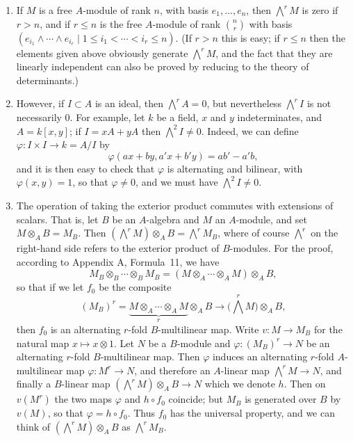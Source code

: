 \begin{enumerate}[(1)]
  \item If $M$ is a free $A$-module of rank $n$, with basis $e_1, \ldots, e_n$, then
        $\bigwedge^r M$ is zero if $r > n$, and if $r \le n$ is the free $A$-module of rank
        $\binom{n}{r}$ with basis $(e_{i_1} \wedge \cdots \wedge e_{i_r} \mid 1 \le i_1 < \cdots < i_r \le n)$.
        (If $r > n$ this is easy; if $r \le n$ then the elements given above obviously
        generate $\bigwedge^r M$, and the fact that they are linearly independent can
        also be proved by reducing to the theory of determinants.)

  \item However, if $I \subset A$ is an ideal, then $\bigwedge^r A = 0$, but nevertheless
        $\bigwedge^r I$ is not necessarily $0$. For example, let $k$ be a field, $x$ and $y$
        indeterminates, and $A = k[x, y]$; if $I = xA + yA$ then $\bigwedge^2 I \ne 0$. Indeed,
        we can define $\varphi\colon I \times I \to k = A/I$ by
        \[
          \varphi(ax + by, a'x + b'y) = ab' - a'b,
        \]
        and it is then easy to check that $\varphi$ is alternating and bilinear, with
        $\varphi(x, y) = 1$, so that $\varphi \ne 0$, and we must have $\bigwedge^2 I \ne 0$.

  \item The operation of taking the exterior product commutes with extensions
        of scalars. That is, let $B$ be an $A$-algebra and $M$ an $A$-module, and set
        $M \otimes_A B = M_B$. Then $(\bigwedge^r M) \otimes_A B = \bigwedge^r M_B$, where of course
        $\bigwedge^r$ on the right-hand side refers to the exterior product of $B$-modules.
        For the proof, according to Appendix A, Formula~11, we have
        \[
          M_B \otimes_B \cdots \otimes_B M_B = (M \otimes_A \cdots \otimes_A M) \otimes_A B,
        \]
        so that if we let $f_0$ be the composite
        \[
          (M_B)^r = \underbrace{M \otimes_A \cdots \otimes_A M}_{r} \otimes_A B \to
              \Big(\bigwedge^r M\Big) \otimes_A B,
        \]
        then $f_0$ is an alternating $r$-fold $B$-multilinear map. Write
        $v\colon M \to M_B$ for the natural map $x \mapsto x \otimes 1$. Let $N$ be a $B$-module and
        $\varphi\colon (M_B)^r \to N$ be an alternating $r$-fold $B$-multilinear map. Then
        $\varphi$ induces an alternating $r$-fold $A$-multilinear map $\varphi\colon M^r \to N$,
        and therefore an $A$-linear map $\bigwedge^r M \to N$, and finally a $B$-linear map
        $(\bigwedge^r M) \otimes_A B \to N$ which we denote $h$. Then on $v(M^r)$ the two maps
        $\varphi$ and $h \circ f_0$ coincide; but $M_B$ is generated over $B$ by $v(M)$, so that
        $\varphi = h \circ f_0$. Thus $f_0$ has the universal property, and we can think of
        $(\bigwedge^r M) \otimes_A B$ as $\bigwedge^r M_B$.
\end{enumerate}

